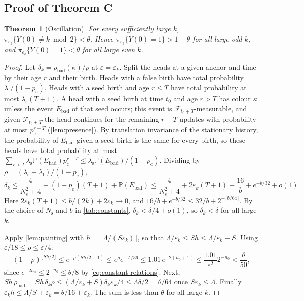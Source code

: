 \documentclass[11pt]{article}
\theoremstyle{plain}
\newtheorem{theorem}{Theorem}[section]
\theoremstyle{definition}
\theoremstyle{remark}
\newcommand{\Prob}{\mathbb P}
\newcommand{\eps}{\varepsilon}
\newcommand{\cF}{\mathcal F}
\begin{document}
\subsection{Proof of Theorem C}

\begin{theorem}[Oscillation]\label{thm:oscillation}
For every sufficiently large $k$, $\pi_{\eps_k}\{Y(0)\ne k\bmod2\}<\theta$. Hence $\pi_{\eps_k}\{Y(0)=1\}>1-\theta$ for all large odd $k$, and $\pi_{\eps_k}\{Y(0)=1\}<\theta$ for all large even $k$.
\end{theorem}

\begin{proof}
Let $\delta_k=\rho_{\mathrm{bad}}(\kappa)/\rho$ at $\eps=\eps_k$. Split the heads at a given anchor and time by their age $r$ and their birth. Heads with a false birth have total probability $\lambda_{\mathrm f}/(1-p_{\mathrm c})$. Heads with a seed birth and age $r\le T$ have total probability at most $\lambda_{\mathrm s}(T+1)$. A head with a seed birth at time $t_0$ and age $r>T$ has colour $\kappa$ unless the event $E_{\mathrm{bad}}$ of that seed occurs; this event is $\cF_{t_0+T}$-measurable, and given $\cF_{t_0+T}$ the head continues for the remaining $r-T$ updates with probability at most $p_{\mathrm c}^{r-T}$ (\cref{lem:presence}). By translation invariance of the stationary history, the probability of $E_{\mathrm{bad}}$ given a seed birth is the same for every birth, so these heads have total probability at most $\sum_{r>T}\lambda_{\mathrm s}\Prob(E_{\mathrm{bad}})p_{\mathrm c}^{r-T}\le\lambda_{\mathrm s}\Prob(E_{\mathrm{bad}})/(1-p_{\mathrm c})$. Dividing by $\rho=(\lambda_{\mathrm s}+\lambda_{\mathrm f})/(1-p_{\mathrm c})$,
\[
\delta_k\le\frac4{N_{\mathrm s}^2+4}+(1-p_{\mathrm c})(T+1)+\Prob(E_{\mathrm{bad}})\le\frac4{N_{\mathrm s}^2+4}+2\eps_k(T+1)+\frac{16}b+e^{-b/32}+o(1).
\]
Here $2\eps_k(T+1)\le b/(2k)+2\eps_k\to0$, and $16/b+e^{-b/32}\le32/b+2^{-\lfloor b/64\rfloor}$. By the choice of $N_{\mathrm s}$ and $b$ in \cref{tab:constants}, $\delta_k<\delta/4+o(1)$, so $\delta_k<\delta$ for all large $k$.

Apply \cref{lem:painting} with $h=\lceil\Lambda/(S\eps_k)\rceil$, so that $\Lambda/\eps_k\le Sh\le\Lambda/\eps_k+S$. Using $\eps/18\le\rho\le\eps/4$:
\[
(1-\rho)^{\lfloor Sh/2\rfloor}\le e^{-\rho(Sh/2-1)}\le e^{\rho}e^{-\Lambda/36}\le1.01\,e^{-2(n_0+1)}\le\frac{1.01}{e^2}2^{-n_0}<\frac\theta{50},
\]
since $e^{-2n_0}\le2^{-n_0}\le\theta/8$ by \eqref{eq:constant-relations}. Next, $Sh\,\rho_{\mathrm{bad}}=Sh\,\delta_k\rho\le(\Lambda/\eps_k+S)\delta_k\eps_k/4\le\Lambda\delta/2=\theta/64$ once $S\eps_k\le\Lambda$. Finally $\eps_kh\le\Lambda/S+\eps_k=\theta/16+\eps_k$. The sum is less than $\theta$ for all large $k$.
\end{proof}
\end{document}
